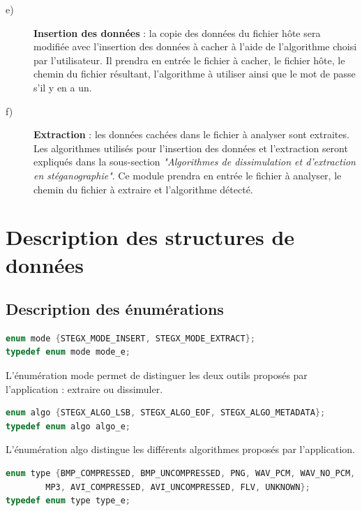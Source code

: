 \documentclass[11pt]{article}
\begin{document}
\begin{description}
\item[e)] \textbf{Insertion des données} : la copie des données du fichier hôte
    sera modifiée avec l'insertion des données à cacher à l'aide de l'algorithme
    choisi par l'utilisateur. 
    Il prendra en entrée le fichier à cacher, le fichier hôte, le chemin du 
    fichier résultant, l'algorithme à utiliser ainsi que le mot de passe 
    s'il y en a un. 

\item[f)] \textbf{Extraction} : les données cachées dans le fichier à analyser
    sont extraites. Les algorithmes utilisés pour l'insertion des données 
    et l'extraction seront expliqués dans la sous-section \textit{"Algorithmes 
    de dissimulation et d'extraction en stéganographie"}. 
    Ce module prendra en entrée le fichier à analyser, le chemin du fichier 
    à extraire et l'algorithme détecté. 

\end{description}

\newpage

\section{Description des structures de données}

\subsection{Description des énumérations}

\begin{lstlisting}[language=c]
enum mode {STEGX_MODE_INSERT, STEGX_MODE_EXTRACT};
typedef enum mode mode_e;
\end{lstlisting}

L'énumération mode permet de distinguer les deux outils proposés par 
l'application : extraire ou dissimuler. 
\newline

\begin{lstlisting}[language=c]
enum algo {STEGX_ALGO_LSB, STEGX_ALGO_EOF, STEGX_ALGO_METADATA};
typedef enum algo algo_e;
\end{lstlisting}

L'énumération algo distingue les différents algorithmes proposés par 
l'application. 
\newline 

\begin{lstlisting}[language=c]
enum type {BMP_COMPRESSED, BMP_UNCOMPRESSED, PNG, WAV_PCM, WAV_NO_PCM, 
        MP3, AVI_COMPRESSED, AVI_UNCOMPRESSED, FLV, UNKNOWN};
typedef enum type type_e;
\end{lstlisting}
\end{document}
